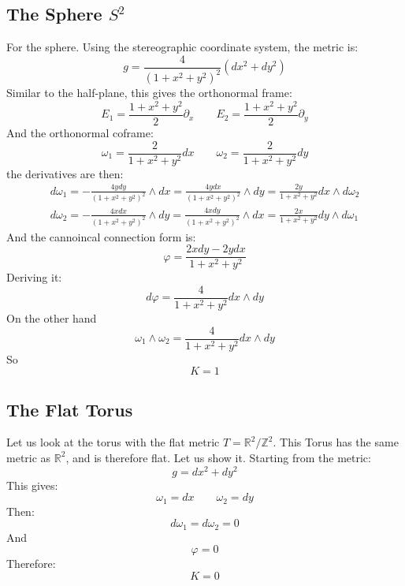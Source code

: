 \documentclass{article}
\newcommand{\R}{\ensuremath{\mathbb{R}}}
\begin{document}
\subsection*{The Sphere $S^2$}
For the sphere. Using the stereographic coordinate system, the metric is:
\begin{equation}
    g = \frac{4}{(1 + x^2 + y^2)^2}\left(dx^2 + dy^2\right)
\end{equation}
Similar to the half-plane, this gives the orthonormal frame:
\begin{equation}
    E_1 = \frac{1 + x^2 + y^2}{2}\partial_x
    \qquad
    E_2 = \frac{1 + x^2 + y^2}{2}\partial_y
\end{equation}
And the orthonormal coframe:
\begin{equation}
    \omega_1 = \frac{2}{1 + x^2 + y^2}dx
    \qquad
    \omega_2 = \frac{2}{1 + x^2 + y^2}dy
\end{equation}
the derivatives are then:
\begin{equation}
\begin{gathered}
    d\omega_1 = -\frac{4ydy}{\left(1 + x^2 + y^2\right)^2}\wedge dx = \frac{4ydx}{\left(1 + x^2 + y^2\right)^2}\wedge dy = \frac{2y}{1 + x^2 + y^2} dx \wedge d\omega_2
    \\
    d\omega_2 = -\frac{4xdx}{\left(1 + x^2 + y^2\right)^2} \wedge dy = \frac{4xdy}{\left(1 + x^2 + y^2\right)^2}\wedge dx = \frac{2x}{1 + x^2 + y^2} dy \wedge d\omega_1
\end{gathered}
\end{equation}
And the cannoincal connection form is:
\begin{equation}
    \varphi = \frac{2xdy - 2ydx}{1 + x^2 + y^2}
\end{equation}
Deriving it:
\begin{equation}
    d\varphi = \frac{4}{1 + x^2 + y^2} dx \wedge dy
\end{equation}
On the other hand
\begin{equation}
    \omega_1 \wedge \omega_2 = \frac{4}{1 + x^2 + y^2} dx \wedge dy
\end{equation}
So
\begin{equation}
    K = 1
\end{equation}
\subsection*{The Flat Torus}
Let us look at the torus with the flat metric $T = \R^2 / \mathbb{Z}^2 $. This Torus has the same metric as $\R^2$, and is therefore flat. Let us show it. Starting from the metric:
\begin{equation}
    g = dx^2 + dy^2
\end{equation}
This gives:
\begin{equation}
    \omega_1 = dx \qquad \omega_2 = dy
\end{equation}
Then:
\begin{equation}
    d\omega_1 = d\omega_2 = 0
\end{equation}
And
\begin{equation}
    \varphi = 0
\end{equation}
Therefore:
\begin{equation}
    K = 0
\end{equation}
\end{document}
